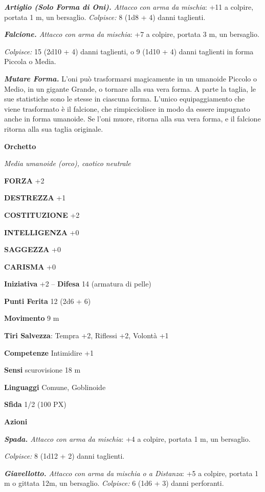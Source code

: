 \begin{multicols}{2}
	\textit{\textbf{Artiglio (Solo Forma di Oni).} Attacco con arma da mischia}: +11 a colpire, portata 1 m, un bersaglio. \textit{Colpisce:} 8 (1d8 + 4) danni taglienti.

	\textit{\textbf{Falcione.} Attacco con arma da mischia}: +7 a colpire, portata 3 m, un bersaglio.

	\textit{Colpisce:} 15 (2d10 + 4) danni taglienti, o 9 (1d10 + 4) danni taglienti in forma Piccola o Media.

	\textit{\textbf{Mutare Forma.}} L'oni può trasformarsi magicamente in un umanoide Piccolo o Medio, in un gigante Grande, o tornare alla sua vera forma. A parte la taglia, le sue statistiche sono le stesse in ciascuna forma. L'unico equipaggiamento che viene trasformato è il falcione, che rimpicciolisce in modo da essere impugnato anche in forma umanoide. Se l'oni muore, ritorna alla sua vera forma, e il falcione ritorna alla sua taglia originale.

	\medskip{}\textbf{Orchetto}

	\textit{Media umanoide (orco), caotico neutrale}

	\textbf{FORZA} +2

	\textbf{DESTREZZA} +1

	\textbf{COSTITUZIONE} +2

	\textbf{INTELLIGENZA} +0

	\textbf{SAGGEZZA} +0

	\textbf{CARISMA} +0

	\textbf{Iniziativa} +2 -- \textbf{Difesa} 14 (armatura di pelle)

	\textbf{Punti Ferita} 12 (2d6 + 6)

	\textbf{Movimento} 9 m

	\textbf{Tiri Salvezza}: Tempra +2, Riflessi +2, Volontà +1

	\textbf{Competenze} Intimidire +1

	\textbf{Sensi} scurovisione 18 m

	\textbf{Linguaggi} Comune, Goblinoide

	\textbf{Sfida} 1/2 (100 PX)

	\textbf{Azioni}

	\textit{\textbf{Spada.} Attacco con arma da mischia}: +4 a colpire, portata 1 m, un bersaglio.

	\textit{Colpisce:} 8 (1d12 + 2) danni taglienti.

	\textit{\textbf{Giavellotto.} Attacco con arma da mischia o a Distanza}: +5 a colpire, portata 1 m o gittata 12m, un bersaglio. \textit{Colpisce:} 6 (1d6 + 3) danni perforanti.


\end{multicols}
